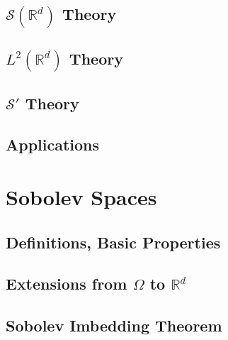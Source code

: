 \documentclass[letterpaper,twoside,12pt]{article}
\theoremstyle{mystyle}
\newcommand{\R}{{\mathbb R}}
\newcommand{\ScS}{\mathcal S}
\begin{document}
\subsection{$\mathcal S \left( \R^d \right)$ Theory}

\subsection{$L^2\left( \R^d \right)$ Theory}

\subsection{$\ScS'$ Theory}

\subsection{Applications}











































\newpage\section{Sobolev Spaces}
\subsection{Definitions, Basic Properties}
\subsection{Extensions from $\Omega$ to $\R^d$}
\subsection{Sobolev Imbedding Theorem}
\end{document}
